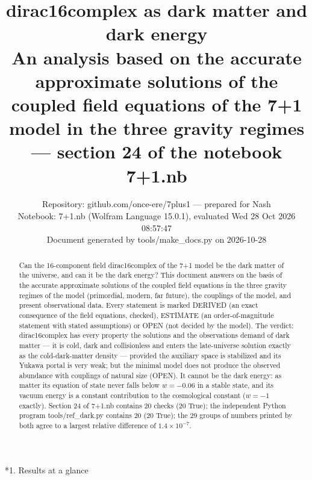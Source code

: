 \documentclass[10pt,a4paper]{article}
\makeatletter
\renewcommand\section{\@startsection{section}{1}{\z@}{-3.5ex \@plus -1ex \@minus -.2ex}{2.3ex \@plus.2ex}{\normalfont\Large\bfseries\raggedright}}
\makeatother
\begin{document}
\title{dirac16complex as dark matter and dark energy\\[0.4em]\large An analysis based on the accurate approximate solutions of the coupled field equations of the 7+1 model in the three gravity regimes — section 24 of the notebook 7+1.nb}
\author{Repository: github.com/once-ere/7plus1 — prepared for Nash\\ Notebook: 7+1.nb (Wolfram Language 15.0.1), evaluated Wed 28 Oct 2026 08:57:47\\ Document generated by tools/make\_docs.py on 2026-10-28}
\date{}
\maketitle
\begin{abstract}
Can the 16-component field dirac16complex of the 7+1 model be the dark matter of the universe, and can it be the dark energy? This document answers on the basis of the accurate approximate solutions of the coupled field equations in the three gravity regimes of the model (primordial, modern, far future), the couplings of the model, and present observational data. Every statement is marked DERIVED (an exact consequence of the field equations, checked), ESTIMATE (an order-of-magnitude statement with stated assumptions) or OPEN (not decided by the model). The verdict: dirac16complex has every property the solutions and the observations demand of dark matter — it is cold, dark and collisionless and enters the late-universe solution exactly as the cold-dark-matter density — provided the auxiliary space is stabilized and its Yukawa portal is very weak; but the minimal model does not produce the observed abundance with couplings of natural size (OPEN). It cannot be the dark energy: as matter its equation of state never falls below $w=-0.06$ in a stable state, and its vacuum energy is a constant contribution to the cosmological constant ($w=-1$ exactly). Section 24 of 7+1.nb contains 20 checks (20 True); the independent Python program tools/ref\_dark.py contains 20 (20 True); the 29 groups of numbers printed by both agree to a largest relative difference of $1.4\times10^{-7}$.
\end{abstract}
\tableofcontents
{}\section*{1. Results at a glance}
\end{document}
